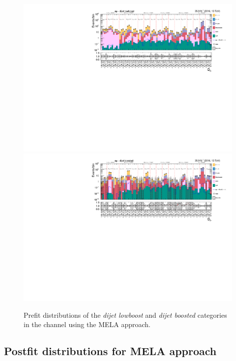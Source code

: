\begin{figure}[h!]
    \centering       
        \includegraphics[width=\textwidth]{Figures/statana/Postfit_JEC_mela3D/prefit_htt_em_3_13TeV.pdf}\\
        \includegraphics[width=\textwidth]{Figures/statana/Postfit_JEC_mela3D/prefit_htt_em_4_13TeV.pdf}
    \caption{Prefit distributions of the \textit{dijet lowboost} and \textit{dijet boosted} categories in the \emu{} channel  using the MELA approach.}
\end{figure}
\clearpage
\subsection{Postfit distributions for MELA approach}


